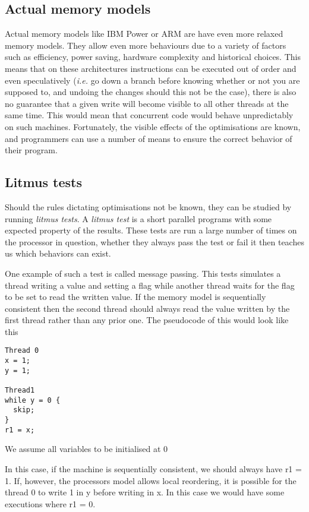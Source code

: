 \documentclass[a4,12pt]{article}
\begin{document}
\subsection{Actual memory models}

Actual memory models like IBM Power or ARM are have even more relaxed memory models. They allow even more behaviours due to a variety of factors such as efficiency, power saving, hardware complexity and historical choices. This means that on these architectures instructions can be executed out of order and even speculatively (\emph{i.e.} go down a branch before knowing whether or not you are supposed to, and undoing the changes should this not be the case), there is also no guarantee that a given write will become visible to all other threads at the same time. This would mean that concurrent code would behave unpredictably on such machines. Fortunately, the visible effects of the optimisations are known, and programmers can use a number of means to ensure the correct behavior of their program.

\subsection{Litmus tests}

Should the rules dictating optimisations not be known, they can be studied by running \emph{litmus tests}. A \emph{litmus test} is a short parallel programs with some expected property of the results. These tests are run a large number of times on the processor in question, whether they always pass the test or fail it then teaches us which behaviors can exist.

One example of such a test is called message passing. This tests simulates a thread writing a value and setting a flag while another thread waits for the flag to be set to read the written value. If the memory model is sequentially consistent then the second thread should always read the value written by the first thread rather than any prior one. The pseudocode of this would look like this

\begin{lstlisting}
Thread 0
x = 1;
y = 1;

Thread1
while y = 0 {
  skip;
}
r1 = x;
\end{lstlisting}

{\footnotesize{We assume all variables to be initialised at 0}}

In this case, if the machine is sequentially consistent, we should always have r1 = 1. If, however, the processors model allows local reordering, it is possible for the thread 0 to write 1 in y before writing in x. In this case we would have some executions where r1 = 0.
\end{document}

